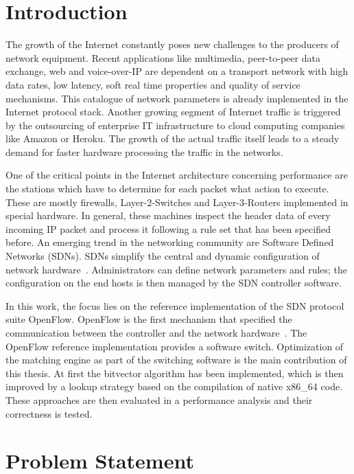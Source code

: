 \documentclass[conference]{IEEEtran}
\begin{document}
\section{Introduction}
\label{sec:intro}
The growth of the Internet constantly poses new challenges to the producers of network equipment.
Recent applications like multimedia, peer-to-peer data exchange, web and voice-over-IP are dependent on a transport network with
high data rates, low latency, soft real time properties and quality of service mechanisms.
This catalogue of network parameters is already implemented in the Internet protocol stack.
Another growing segment of Internet traffic is triggered by the outsourcing of 
enterprise IT infrastructure to cloud computing companies like Amazon or Heroku.
The growth of the actual traffic itself leads to a steady demand for faster hardware processing the traffic in the networks.

One of the critical points in the Internet architecture concerning performance 
are the stations which have to determine for each packet what action to execute.
These are mostly firewalls, Layer-2-Switches and Layer-3-Routers implemented in special hardware.
In general, these machines inspect the header data of every incoming IP packet and process it 
following a rule set that has been specified before.
An emerging trend in the networking community are Software Defined Networks (SDNs).
SDNs simplify the central and dynamic configuration of network hardware~\cite{onf_whitepaper}.
Administrators can define network parameters and rules; the configuration 
on the end hosts is then managed by the SDN controller software.

In this work, the focus lies on the reference implementation of the SDN protocol suite OpenFlow.
OpenFlow is the first mechanism that specified the communication between the controller and the network hardware~\cite{onf_whitepaper}.
The OpenFlow reference implementation provides a software switch.
Optimization of the matching engine as part of the switching software is the main contribution of this thesis.
At first the bitvector algorithm has been implemented, which is then improved by a lookup strategy
based on the compilation of native x86\_64 code.
These approaches are then evaluated in a performance analysis and their correctness is tested.

\section{Problem Statement}
\end{document}
